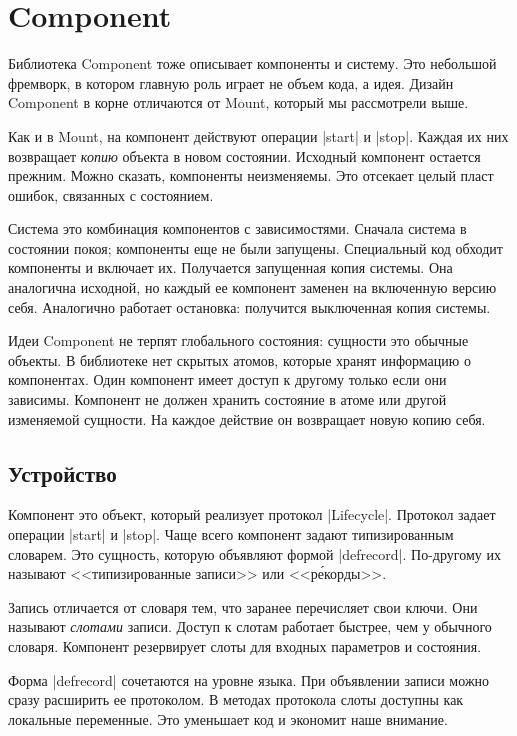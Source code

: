 \section{Component}

Библиотека Component
тоже описывает компоненты и систему. Это небольшой фремворк, в котором главную
роль играет не объем кода, а идея. Дизайн Component в корне отличаются
от Mount, который мы рассмотрели выше.

Как и в Mount, на компонент действуют операции \spverb|start| и
\spverb|stop|. Каждая их них возвращает \emph{копию} объекта в новом
состоянии. Исходный компонент остается прежним. Можно сказать, компоненты
неизменяемы. Это отсекает целый пласт ошибок, связанных с состоянием.

Система это комбинация компонентов с зависимостями. Сначала система в состоянии
покоя; компоненты еще не были запущены. Специальный код обходит компоненты и
включает их. Получается запущенная копия системы. Она аналогична исходной, но
каждый ее компонент заменен на включенную версию себя. Аналогично работает
остановка: получится выключенная копия системы.

Идеи Component не терпят глобального состояния: сущности это обычные объекты. В
библиотеке нет скрытых атомов, которые хранят информацию о компонентах. Один
компонент имеет доступ к другому только если они зависимы. Компонент не должен
хранить состояние в атоме или другой изменяемой сущности. На каждое действие он
возвращает новую копию себя.

\subsection{Устройство}

Компонент это объект, который реализует протокол \spverb|Lifecycle|. Протокол
задает операции \spverb|start| и \spverb|stop|. Чаще всего компонент задают
типизированным словарем. Это сущность, которую объявляют формой
\spverb|defrecord|. По-другому их называют <<типизированные записи>> или
<<р\'{е}корды>>.

Запись отличается от словаря тем, что заранее перечисляет свои ключи. Они
называют \emph{слотами} записи. Доступ к слотам работает быстрее, чем у обычного
словаря. Компонент резервирует слоты для входных параметров и состояния.

Форма \spverb|defrecord| сочетаются на уровне языка. При объявлении записи можно
сразу расширить ее протоколом. В методах протокола слоты доступны как локальные
переменные. Это уменьшает код и экономит наше внимание.

